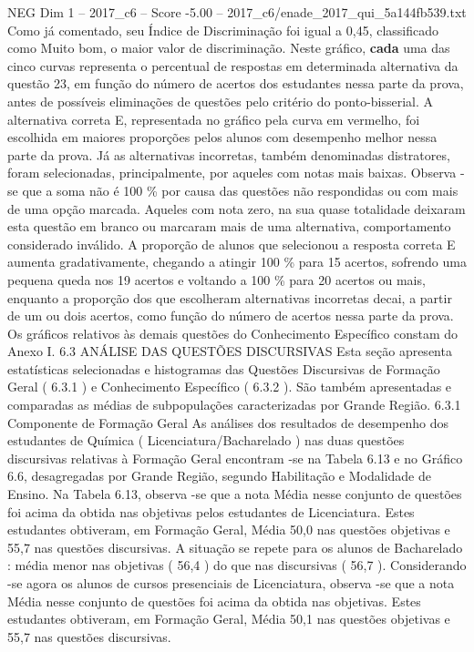 \begin{textsample}{NEG Dim 1 – 2017\_c6 – Score -5.00 – 2017\_c6/enade\_2017\_qui\_5a144fb539.txt}
Como já comentado, seu Índice de Discriminação foi igual a 0,45, classificado como Muito bom, o maior valor de discriminação.
Neste gráfico, \textbf{cada} uma das cinco curvas representa o percentual de respostas em determinada alternativa da questão 23, em função do número de acertos dos estudantes nessa parte da prova, antes de possíveis eliminações de questões pelo critério do ponto-bisserial.
A alternativa correta E, representada no gráfico pela curva em vermelho, foi escolhida em maiores proporções pelos alunos com desempenho melhor nessa parte da prova.
Já as alternativas incorretas, também denominadas distratores, foram selecionadas, principalmente, por aqueles com notas mais baixas.
Observa -se que a soma não é 100 \% por causa das questões não respondidas ou com mais de uma opção marcada.
Aqueles com nota zero, na sua quase totalidade deixaram esta questão em branco ou marcaram mais de uma alternativa, comportamento considerado inválido.
A proporção de alunos que selecionou a resposta correta E aumenta gradativamente, chegando a atingir 100 \% para 15 acertos, sofrendo uma pequena queda nos 19 acertos e voltando a 100 \% para 20 acertos ou mais, enquanto a proporção dos que escolheram alternativas incorretas decai, a partir de um ou dois acertos, como função do número de acertos nessa parte da prova.
Os gráficos relativos às demais questões do Conhecimento Específico constam do Anexo I. 6.3 ANÁLISE DAS QUESTÕES DISCURSIVAS Esta seção apresenta estatísticas selecionadas e histogramas das Questões Discursivas de Formação Geral ( 6.3.1 ) e Conhecimento Específico ( 6.3.2 ).
São também apresentadas e comparadas as médias de subpopulações caracterizadas por Grande Região. 6.3.1 Componente de Formação Geral As análises dos resultados de desempenho dos estudantes de Química ( Licenciatura/Bacharelado ) nas duas questões discursivas relativas à Formação Geral encontram -se na Tabela 6.13 e no Gráfico 6.6, desagregadas por Grande Região, segundo Habilitação e Modalidade de Ensino.
Na Tabela 6.13, observa -se que a nota Média nesse conjunto de questões foi acima da obtida nas objetivas pelos estudantes de Licenciatura.
Estes estudantes obtiveram, em Formação Geral, Média 50,0 nas questões objetivas e 55,7 nas questões discursivas.
A situação se repete para os alunos de Bacharelado : média menor nas objetivas ( 56,4 ) do que nas discursivas ( 56,7 ).
Considerando -se agora os alunos de cursos presenciais de Licenciatura, observa -se que a nota Média nesse conjunto de questões foi acima da obtida nas objetivas.
Estes estudantes obtiveram, em Formação Geral, Média 50,1 nas questões objetivas e 55,7 nas questões discursivas.

\end{textsample}
